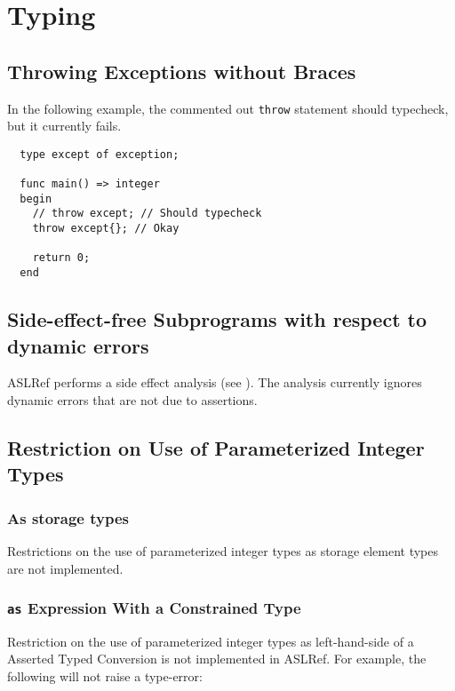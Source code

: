 \section{Typing}

\subsection{Throwing Exceptions without Braces}
In the following example, the commented out \texttt{throw} statement should typecheck,
but it currently fails.

\begin{verbatim}
  type except of exception;

  func main() => integer
  begin
    // throw except; // Should typecheck
    throw except{}; // Okay

    return 0;
  end
\end{verbatim}

\subsection{Side-effect-free Subprograms with respect to dynamic errors}
ASLRef performs a side effect analysis (see ).
The analysis currently ignores dynamic errors that are not due to assertions.

\subsection{Restriction on Use of Parameterized Integer Types}

\subsubsection{As storage types}
Restrictions on the use of parameterized integer types as storage element types are not
implemented.


\subsubsection{\texttt{as} Expression With a Constrained Type}

Restriction on the use of parameterized integer types as left-hand-side of a
Asserted Typed Conversion is not implemented in ASLRef.
%
For example, the following will not raise a type-error:


